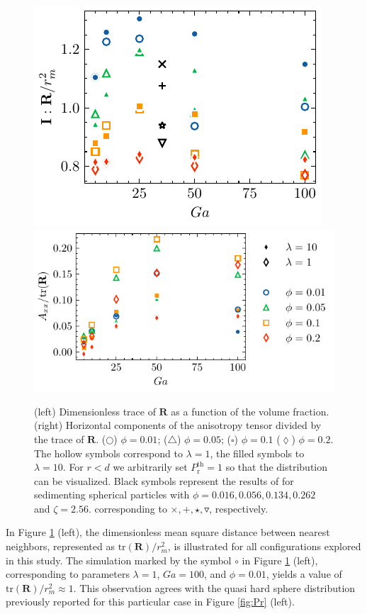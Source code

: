 \begin{figure}[h!]
    \centering
    \includegraphics[height=0.3\textwidth]{image/HOMOGENEOUS_NEW/PA/trR.pdf}
    \includegraphics[height=0.3\textwidth]{image/HOMOGENEOUS_NEW/PA/Axx.pdf}
    \caption{
        (left) Dimensionless trace of $\textbf{R}$ as a function of the volume fraction.%
        (right) Horizontal components of the anisotropy tensor divided by the trace of $\textbf{R}$.%
    ($\pmb\bigcirc$) $\phi = 0.01$; ($\pmb\triangle$) $ \phi = 0.05$; ($\pmb\square$) $\phi = 0.1$ ($\pmb\lozenge$) $\phi = 0.2$.
    The hollow symbols correspond to $\lambda = 1$, the filled symbols to $\lambda = 10$.
    For $r<d$ we arbitrarily set $P_\text{r}^\text{th} = 1$ so that the distribution can be visualized.
    Black symbols represent the results of \citet{zhang2023evolution} for sedimenting spherical particles with $\phi = 0.016,0.056,0.134,0.262$ and $\zeta = 2.56$. %
    corresponding to $\pmb\times,\pmb +, \pmb\star , \pmb\triangledown$, respectively.
    }
    \label{fig:A}
\end{figure}
In Figure \ref{fig:A} (left), the dimensionless mean square distance between nearest neighbors, represented as $\text{tr}(\textbf{R})/r_m^2$, is illustrated for all configurations explored in this study. The simulation marked by the symbol \textcolor{col1}{$\pmb\circ$} in Figure \ref{fig:A} (left), corresponding to parameters $\lambda = 1$, $Ga = 100$, and $\phi = 0.01$, yields a value of $\text{tr}(\textbf{R})/r_m^2 \approx 1$. This observation agrees with the quasi hard sphere distribution previously reported for this particular case in Figure \ref{fig:Pr} (left).
